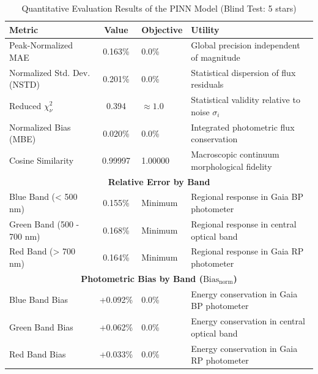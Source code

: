 
\begin{table}[htpb]
\centering
\caption{Quantitative Evaluation Results of the PINN Model (Blind Test: 5 stars)}
\label{tab:pinn_evaluation}
\begin{tabular}{lcll}
\hline
\textbf{Metric} & \textbf{Value} & \textbf{Objective} & \textbf{Utility} \\
\hline
Peak-Normalized MAE & 0.163\% & 0.0\% & Global precision independent of magnitude \\
Normalized Std. Dev. (NSTD) & 0.201\% & 0.0\% & Statistical dispersion of flux residuals \\
Reduced $\chi^2_\nu$ & 0.394 & $\approx 1.0$ & Statistical validity relative to noise $\sigma_i$ \\
Normalized Bias (MBE) & 0.020\% & 0.0\% & Integrated photometric flux conservation \\
Cosine Similarity & 0.99997 & 1.00000 & Macroscopic continuum morphological fidelity \\
\hline
\multicolumn{4}{c}{\textbf{Relative Error by Band}} \\
\hline
Blue Band (< 500 nm) & 0.155\% & Minimum & Regional response in Gaia BP photometer \\
Green Band (500 - 700 nm) & 0.168\% & Minimum & Regional response in central optical band \\
Red Band (> 700 nm) & 0.164\% & Minimum & Regional response in Gaia RP photometer \\
\hline
\multicolumn{4}{c}{\textbf{Photometric Bias by Band ($\text{Bias}_{\text{norm}}$)}} \\
\hline
Blue Band Bias & +0.092\% & 0.0\% & Energy conservation in Gaia BP photometer \\
Green Band Bias & +0.062\% & 0.0\% & Energy conservation in central optical band \\
Red Band Bias & +0.033\% & 0.0\% & Energy conservation in Gaia RP photometer \\
\hline
\end{tabular}
\end{table}
